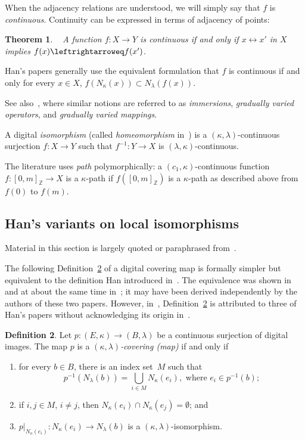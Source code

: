 \documentclass{article} \UseRawInputEncoding
\theoremstyle{plain}
\newtheorem{thm}{Theorem}
\theoremstyle{definition}
\newtheorem{definition}[thm]{Definition}
\numberwithin{thm}{section}
\newcommand{\adj}{\leftrightarrow}
\newcommand{\adjeq}{\leftrightarroweq}
\def\Z{{\mathbb Z}}
\begin{document}
When the adjacency relations are understood, we will simply say that $f$ is \emph{continuous}. Continuity can be expressed in terms of adjacency of points:

\begin{thm}
{\rm ~\cite{Rosenfeld,Boxer99}}
\label{continuityPreserveAdj}
A function $f:X\to Y$ is continuous if and only if $x \adj x'$ in $X$ 
implies $f(x) \adjeq f(x')$.
\end{thm}

Han's papers generally use the equivalent formulation that
$f$ is continuous if and only for every $x \in X$,
$f(N_{\kappa}(x)) \subset N_{\lambda}(f(x))$.

See also~\cite{Chen94,Chen04}, where similar notions are referred to as {\em immersions}, {\em gradually varied operators},
and {\em gradually varied mappings}.

A digital {\em isomorphism} (called {\em homeomorphism}
in~\cite{Boxer94}) is a $(\kappa,\lambda)$-continuous
surjection $f: X \to Y$ such that $f^{-1}: Y \to X$ is
$(\lambda,\kappa)$-continuous.

The literature uses {\em path} polymorphically: a
$(c_1,\kappa)$-continuous function $f: [0,m]_{\Z} \to X$
is a $\kappa$-path if $f([0,m]_{\Z})$ is a $\kappa$-path
as described above from $f(0)$ to $f(m)$.

\subsection{Han's variants on local isomorphisms}
Material in this section is largely quoted or paraphrased from~\cite{BxVariants}.

The following Definition~\ref{coveringDef} of a digital covering map is
formally simpler but equivalent to the definition Han introduced in~\cite{Han05}.
The equivalence was shown in~\cite{BxAndWedges} and at about the same time
in~\cite{HanLectNotes}; it may have been derived independently by the authors of
these two papers. However, in~\cite{HanCorrig}, Definition~\ref{coveringDef} is attributed to three of Han's papers without
acknowledging its origin in~\cite{BxAndWedges,HanLectNotes}.

\begin{definition}
   {\rm \cite{BxAndWedges}}
   \label{coveringDef}
   Let $p: (E,\kappa) \to (B,\lambda)$ be a continuous
   surjection of digital images. The map $p$ is a
   {\em $(\kappa,\lambda)$-covering (map)} if and only if
   \begin{enumerate}
       \item for every $b \in B$, there is an index set~$M$
             such that 
             \[p^{-1}(N_{\lambda}(b)) = 
             \bigcup_{i \in M} N_{\kappa}(e_i), 
             \mbox{ where } e_i \in p^{-1}(b);
             \]
       \item if $i,j \in M$, $i \neq j$, then
            $N_{\kappa}(e_i) \cap N_{\kappa}(e_j) =
            \emptyset$; and
       \item $p|_{N_{\kappa}(e_i)}: N_{\kappa}(e_i) \to
              N_{\lambda}(b)$ is a 
              $(\kappa,\lambda)$-isomorphism.
   \end{enumerate}
\end{definition}
\end{document}
